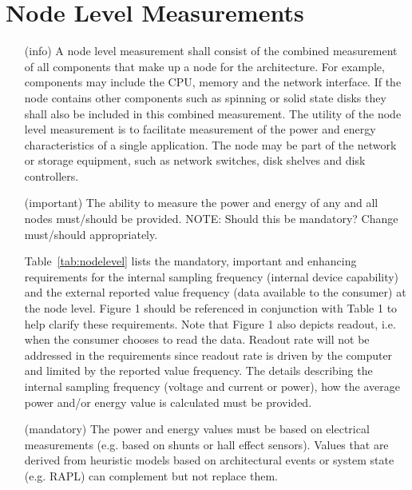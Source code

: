 \section{Node Level Measurements}
\begin{itemize}

\item[(info)]
A node level measurement shall consist of the combined measurement of all components that make up a node for the architecture. For example, components may include the CPU, memory and the network interface. If the node contains other components such as spinning or solid state disks they shall also be included in this combined measurement. The utility of the node level measurement is to facilitate measurement of the power and energy characteristics of a single application. The node may be part of the network or storage equipment, such as network switches, disk shelves and disk controllers.   

\item[(important)]
The ability to measure the power and energy of any and all nodes must/should be provided.  NOTE: Should this be mandatory? Change must/should appropriately.

	Table~\ref{tab:nodelevel} lists the mandatory, important and enhancing requirements for the internal sampling frequency (internal device capability) and the external reported value frequency (data available to the consumer) at the node level. Figure 1 should be referenced in conjunction with Table 1 to help clarify these requirements. Note that Figure 1 also depicts readout, i.e. when the consumer chooses to read the data. Readout rate will not be addressed in the requirements since readout rate is driven by the computer and limited by the reported value frequency. The details describing the internal sampling frequency (voltage and current or power), how the average power and/or energy value is calculated must be provided.

\item[(mandatory)]
The power and energy values must be based on electrical measurements (e.g. based on shunts or hall effect sensors). Values that are derived from heuristic models based on architectural events or system state (e.g. RAPL) can complement but not replace them.
\end{itemize}

